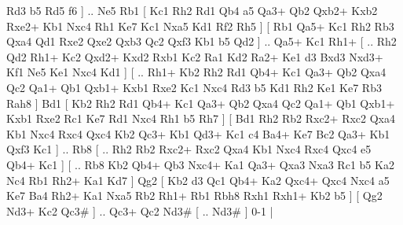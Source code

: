 Rd3 b5  Rd5 f6   ] .. Ne5    Rb1 [  Kc1 Rh2  Rd1 Qb4  a5 Qa3+  Qb2 Qxb2+  Kxb2 Rxe2+  Kb1 Nxc4  Rh1 Ke7  Kc1 Nxa5  Kd1 Rf2  Rh5   ]  [  Rb1 Qa5+  Kc1 Rh2  Rb3 Qxa4  Qd1 Rxe2  Qxe2 Qxb3  Qc2 Qxf3  Kb1 b5  Qd2   ] .. Qa5+    Kc1   Rh1+ [ .. Rh2  Qd2 Rh1+  Kc2 Qxd2+  Kxd2 Rxb1  Kc2 Ra1  Kd2 Ra2+  Ke1 d3  Bxd3 Nxd3+  Kf1 Ne5  Ke1 Nxc4  Kd1   ]  [ .. Rh1+  Kb2 Rh2  Rd1 Qb4+  Kc1 Qa3+  Qb2 Qxa4  Qc2 Qa1+  Qb1 Qxb1+  Kxb1 Rxe2  Kc1 Nxc4  Rd3 b5  Kd1 Rh2  Ke1 Ke7  Rb3 Rah8   ]  Bd1 [  Kb2 Rh2  Rd1 Qb4+  Kc1 Qa3+  Qb2 Qxa4  Qc2 Qa1+  Qb1 Qxb1+  Kxb1 Rxe2  Rc1 Ke7  Rd1 Nxc4  Rh1 b5  Rh7   ]  [  Bd1 Rh2  Rb2 Rxc2+  Rxc2 Qxa4  Kb1 Nxc4  Rxc4 Qxc4  Kb2 Qc3+  Kb1 Qd3+  Kc1 c4  Ba4+ Ke7  Bc2 Qa3+  Kb1 Qxf3  Kc1   ] .. Rb8 [ .. Rh2  Rb2 Rxc2+  Rxc2 Qxa4  Kb1 Nxc4  Rxc4 Qxc4  e5 Qb4+  Kc1   ]  [ .. Rb8  Kb2 Qb4+  Qb3 Nxc4+  Ka1 Qa3+  Qxa3 Nxa3  Rc1 b5  Ka2 Nc4  Rb1 Rh2+  Ka1 Kd7   ]  Qg2 [  Kb2 d3  Qc1 Qb4+  Ka2 Qxc4+  Qxc4 Nxc4  a5 Ke7  Ba4 Rh2+  Ka1 Nxa5  Rb2 Rh1+  Rb1 Rbh8  Rxh1 Rxh1+  Kb2 b5   ]  [  Qg2 Nd3+  Kc2 Qc3#   ] .. Qc3+    Qc2  Nd3#    [ .. Nd3#   ] 0-1  |
